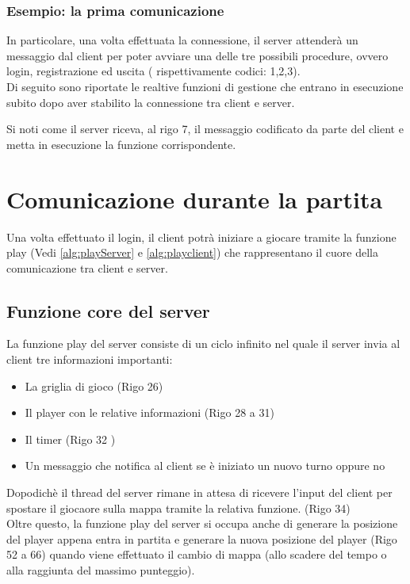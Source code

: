 \documentclass[a4paper]{article}
\begin{document}
 \subsubsection{Esempio: la prima comunicazione}
 In particolare, una volta effettuata la connessione,
il server attenderà un messaggio dal client per poter avviare una delle tre possibili procedure, ovvero login, registrazione ed uscita ( rispettivamente codici: 1,2,3).\\
Di seguito sono riportate le realtive funzioni di gestione che entrano in esecuzione subito dopo aver stabilito la connessione
tra client e server.

Si noti come il server riceva, al rigo 7, il messaggio codificato da parte del client e metta in esecuzione la funzione corrispondente.


\section{Comunicazione durante la partita}
Una volta effettuato il login, il client potrà iniziare a giocare tramite la funzione play (Vedi \autoref{alg:playServer} e \autoref{alg:playclient})
che rappresentano il cuore della comunicazione tra client e server.\\
\subsection{Funzione core del server}
La funzione play del server consiste di un ciclo infinito nel quale il server invia al client tre informazioni importanti:
\begin{itemize}
  \setlength\itemsep{0.2mm}
  \item La griglia di gioco (Rigo 26)
  \item Il player con le relative informazioni (Rigo 28 a 31)
  \item Il timer (Rigo 32 )
  \item Un messaggio che notifica al client se è iniziato un nuovo turno oppure no
\end{itemize}
Dopodichè il thread del server rimane in attesa di ricevere l'input del client per spostare il giocaore sulla mappa tramite la relativa funzione. (Rigo 34)
\\Oltre questo, la funzione play del server si occupa anche di generare la posizione del player appena entra in partita e generare la nuova posizione del player (Rigo 52 a 66) quando viene effettuato il cambio di mappa (allo scadere del tempo o alla raggiunta del massimo punteggio).
\\
\\
\end{document}
